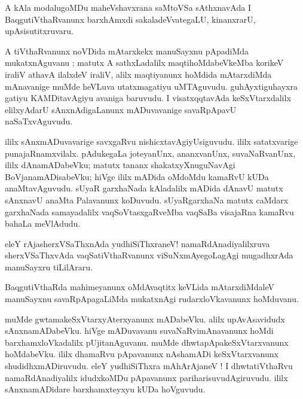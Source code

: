 \documentclass{article}
\begin{document}
\begin{mn}
A kAla modalugoMDu maheVshavxrana saMtoVSa sAthxnavAda I BaqgutiVthaRvanunx barxhAmxdi 
sakaladeVvategaLU, kinanxrarU, upAsisutitxruvaru.
\end{mn}

\begin{mn}
A tiVthaRvanunx noVDida mAtarxkekx manuSayxnu pApadiMda mukatxnAguvanu ; matutx A sathxLadalilx  
maqtihoMdabeVkeMba korikeV iraliV athavA ilalxdeV iraliV, alilx maqtiyanunx hoMdida mAtarxdiMda 
mAnavanige muMde heVLuva utatxmagatiyu uMTAguvudu. guhAyxtiguhayxra gatiyu KAMDitavAgiyu avaniga 
baruvudu. I visatxqqtavAda keSxVtarxdalilx elilxyAdarU sAnxnAdigaLanunx  mADuvavanige savaRpApavU 
naSaTxvAguvudu.
\end{mn}

\begin{mn}
ililx sAnxmADuvavarige savxgaRvu nishicxtavAgiyUsiguvudu. ililx satatxvarige punajaRnamxvilalx. 
pAdukegaLa joteyanUnx, ananxvanUnx, suvaNaRvanUnx, ililx dAnamADabeVku; matutx tananx 
shakatxyXnuguNavAgi BoVjanamADisabeVku; hiVge ililx mADida oMdoMdu kamaRvU kUDa anaMtavAguvudu. 
sUyaR garxhaNada kAladalilx mADida dAnavU matutx sAnxnavU anaMta Palavanunx koDuvudu. 
sUyaRgarxhaNa matutx caMdarx garxhaNada samayadalilx vaqSoVtasxgaRveMba vaqSaBa visajaRna kamaRvu 
bahaLa meVlAdudu.
\end{mn}

\begin{mn}
eleY rAjasherxVSaThxnAda yudhiSiThxraneV! namaRdAnadiyalilxruva sherxVSaThxvAda 
vaqSatiVthaRvanunx viSuNxmAyegoLagAgi mugadhxrAda manuSayxru tiLilAraru.
\end{mn}

\begin{mn}
BaqgutiVthaRda mahimeyanunx oMdAvaqtitx keVLida mAtarxdiMdaleV manuSayxnu savaRpApagaLiMda 
mukatxnAgi rudarxloVkavanunx hoMduvanu.
\end{mn}

\begin{mn}
muMde gwtamakeSxVtarxyAterxyanunx mADabeVku.  alilx upAvAsavidudx sAnxnamADabeVku. hiVge mADuvavanu
suvaNaRvimAnavanunx hoMdi barxhamxloVkadalilx pUjitanAguvanu. muMde dhwtapApakeSxVtarxvanunx 
hoMdabeVku. ililx dhamaRvu pApavanunx nAshamADi keSxVtarxvanunx shudidhxmADiruvudu. eleY 
yudhiSiThxra mAhArAjaneV ! I dhwtatiVthaRvu namaRdAnadiyalilx idudxkoMDu pApavanunx 
pariharisuvudAgiruvudu. ililx sAnxnamADidare barxhamxteyxyu kUDa hoVguvudu.
\end{mn}
\end{document}
